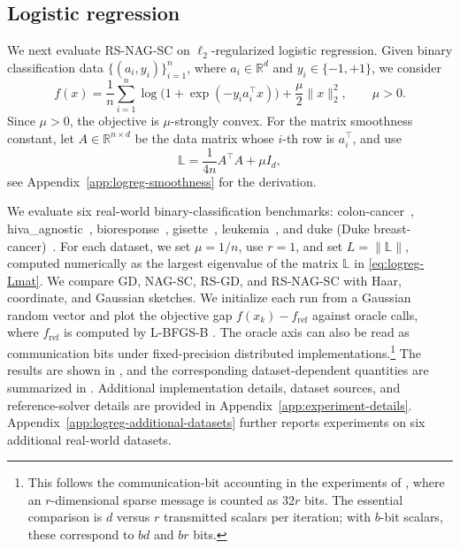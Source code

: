 \documentclass[10pt]{article}
\newcommand{\R}{\mathbb{R}}
\newcommand{\Lmat}{\mathbb{L}}
\begin{document}
\subsection{Logistic regression}
\label{subsec:logreg}
We next evaluate RS-NAG-SC on \(\ell_2\)-regularized logistic regression.
Given binary classification data
\(\{(a_i,y_i)\}_{i=1}^n\), where \(a_i\in\R^d\) and
\(y_i\in\{-1,+1\}\),
we consider
\begin{equation}
f(x)
=
\frac{1}{n}\sum_{i=1}^n \log\!\bigl(1+\exp(-y_i a_i^\top x)\bigr)
+\frac{\mu}{2}\|x\|_2^2,
\qquad \mu>0.
\label{eq:logreg-obj}
\end{equation}
Since \(\mu>0\), the objective is \(\mu\)-strongly convex. For the matrix
smoothness constant, let \(A\in\R^{n\times d}\) be the data matrix whose
\(i\)-th row is \(a_i^\top\), and use
\begin{equation}
\Lmat=\frac{1}{4n}A^\top A+\mu I_d,
\label{eq:logreg-Lmat}
\end{equation}
see Appendix~\ref{app:logreg-smoothness} for the derivation.

We evaluate six real-world binary-classification benchmarks:
colon-cancer~\cite{alon1999colon},
hiva\_agnostic~\cite{guyon2007agnostic},
bioresponse~\cite{hamner2012bioresponse},
gisette~\cite{guyon2005nipsfs},
leukemia~\cite{golub1999leukemia}, and
duke (Duke breast-cancer)~\cite{west2001duke}.
For each dataset, we set \(\mu=1/n\), use \(r=1\), and set
\(L=\|\Lmat\|\), computed numerically as the largest eigenvalue of the matrix
\(\Lmat\) in \eqref{eq:logreg-Lmat}.
We compare GD, NAG-SC,
RS-GD, and RS-NAG-SC with Haar, coordinate, and Gaussian sketches. We initialize
each run from a Gaussian random vector and plot the objective gap
\(f(x_k)-f_{\mathrm{ref}}\) against oracle calls, where \(f_{\mathrm{ref}}\) is
computed by L-BFGS-B \citep{byrd1995limited,zhu1997algorithm}.
The oracle axis can also be read as communication bits under fixed-precision
distributed implementations.\footnote{This follows the communication-bit
accounting in the experiments of \citet{li2020acgd}, where an \(r\)-dimensional
sparse message is counted as \(32r\) bits. The essential comparison is \(d\)
versus \(r\) transmitted scalars per iteration; with \(b\)-bit scalars, these
correspond to \(bd\) and \(br\) bits.}
The results are shown in
, and the corresponding
dataset-dependent quantities are summarized in
. Additional implementation details,
dataset sources, and reference-solver details are provided in
Appendix~\ref{app:experiment-details}.
Appendix~\ref{app:logreg-additional-datasets} 
further reports experiments on six additional real-world datasets.
\end{document}
